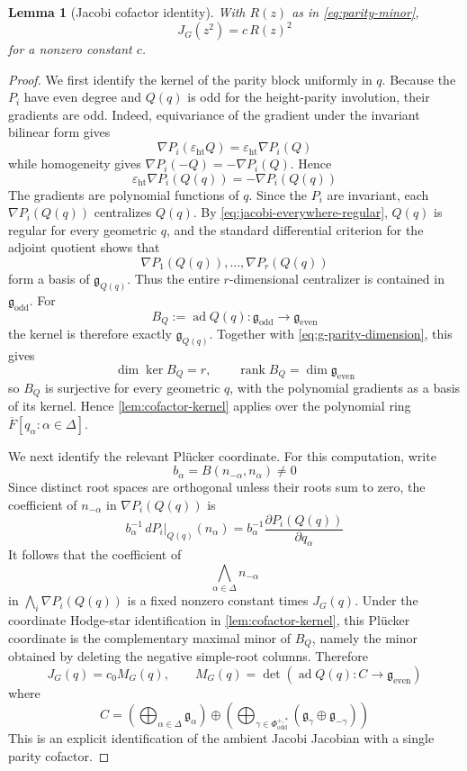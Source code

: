 \documentclass[11pt]{amsart}
\newtheorem{lemma}[lemma]{Lemma}
\theoremstyle{definition}
\theoremstyle{remark}
\newcommand{\Fb}{\overline F}
\newcommand{\ad}{\operatorname{ad}}
\newcommand{\rank}{\operatorname{rank}}
\newcommand{\g}{\mathfrak g}
\begin{document}
\begin{lemma}[Jacobi cofactor identity]\label{lem:jacobi-cofactor-identity}
With $R(z)$ as in \eqref{eq:parity-minor},
\begin{equation}\label{eq:ambient-jacobi-parity}
 J_G(z^2)=c\,R(z)^2
\end{equation}
for a nonzero constant $c$.
\end{lemma}

\begin{proof}
We first identify the kernel of the parity block uniformly in $q$.  Because the $P_i$ have even degree and $Q(q)$ is odd for the height-parity
involution, their gradients are odd.  Indeed, equivariance of the gradient
under the invariant bilinear form gives
\[
 \nabla P_i(\varepsilon_{\mathrm{ht}}Q)
 =\varepsilon_{\mathrm{ht}}\nabla P_i(Q)
\]
while homogeneity gives $\nabla P_i(-Q)=-\nabla P_i(Q)$.  Hence
\[
 \varepsilon_{\mathrm{ht}}\nabla P_i(Q(q))
   =-\nabla P_i(Q(q))
\]
The gradients are polynomial functions of $q$.  Since the $P_i$ are
invariant, each $\nabla P_i(Q(q))$ centralizes $Q(q)$.  By
\eqref{eq:jacobi-everywhere-regular}, $Q(q)$ is regular for every geometric
$q$, and the standard differential criterion for the adjoint quotient shows
that
\[
 \nabla P_1(Q(q)),\ldots,\nabla P_r(Q(q))
\]
form a basis of $\g_{Q(q)}$.  Thus the entire $r$-dimensional centralizer is
contained in $\g_{\mathrm{odd}}$.  For
\[
 B_Q:=\ad Q(q):\g_{\mathrm{odd}}\longrightarrow\g_{\mathrm{even}}
\]
the kernel is therefore exactly $\g_{Q(q)}$.  Together with
\eqref{eq:g-parity-dimension}, this gives
\[
 \dim\ker B_Q=r,
 \qquad
 \rank B_Q=\dim\g_{\mathrm{even}}
\]
so $B_Q$ is surjective for every geometric $q$, with the polynomial gradients
as a basis of its kernel.  Hence \cref{lem:cofactor-kernel} applies over the
polynomial ring $\Fb[q_\alpha:\alpha\in\Delta]$.

We next identify the relevant Pl\"ucker coordinate.  For this computation, write
\[
 b_\alpha=B(n_{-\alpha},n_\alpha)\ne0
\]
Since distinct root spaces are orthogonal unless their roots sum to zero,
the coefficient of $n_{-\alpha}$ in $\nabla P_i(Q(q))$ is
\[
 b_\alpha^{-1}\,
 dP_i|_{Q(q)}(n_\alpha)
 =b_\alpha^{-1}
   \frac{\partial P_i(Q(q))}{\partial q_\alpha}
\]
It follows that the coefficient of
\[
 \bigwedge_{\alpha\in\Delta}n_{-\alpha}
\]
in $\bigwedge_i\nabla P_i(Q(q))$ is a fixed nonzero constant times
$J_G(q)$.  Under the coordinate Hodge-star identification in
\cref{lem:cofactor-kernel}, this Pl\"ucker coordinate is the complementary
maximal minor of $B_Q$, namely the minor obtained by deleting the negative
simple-root columns.  Therefore
\begin{equation}\label{eq:ambient-cofactor-minor}
 J_G(q)=c_0 M_G(q),
 \qquad
 M_G(q)=\det\left(
 \ad Q(q):C\longrightarrow\g_{\mathrm{even}}
 \right)
\end{equation}
where
\[
 C=
 \left(\bigoplus_{\alpha\in\Delta}\g_\alpha\right)
 \oplus
 \left(\bigoplus_{\gamma\in\Phi_{\mathrm{odd}}^{+,*}}
       (\g_\gamma\oplus\g_{-\gamma})\right)
\]
This is an explicit identification of the ambient Jacobi Jacobian with a
single parity cofactor.


\end{proof}
\end{document}
